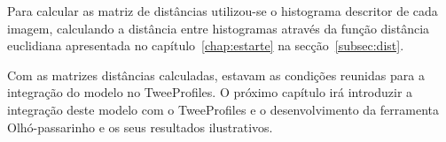 Para calcular as matriz de distâncias utilizou-se o histograma descritor de cada imagem, calculando a distância entre histogramas através da função distância euclidiana apresentada no capítulo~\ref{chap:estarte} na secção~\ref{subsec:dist}.

Com as matrizes distâncias calculadas, estavam as condições reunidas para a integração do modelo no TweeProfiles. O próximo capítulo irá introduzir a integração deste modelo com o TweeProfiles e o desenvolvimento da ferramenta Olhó-passarinho e os seus resultados ilustrativos.